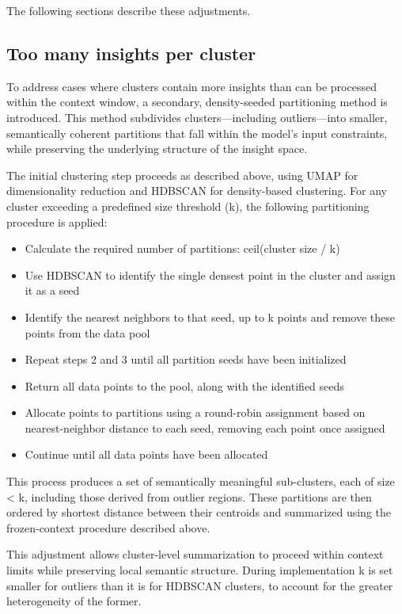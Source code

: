\documentclass[
  11pt,
]{article}
\providecommand{\tightlist}{%
  \setlength{\itemsep}{0pt}\setlength{\parskip}{0pt}}
\begin{document}
The following sections describe these adjustments.

\subsection{Too many insights per
cluster}\label{too-many-insights-per-cluster}

To address cases where clusters contain more insights than can be
processed within the context window, a secondary, density-seeded
partitioning method is introduced. This method subdivides
clusters---including outliers---into smaller, semantically coherent
partitions that fall within the model's input constraints, while
preserving the underlying structure of the insight space.

The initial clustering step proceeds as described above, using UMAP for
dimensionality reduction and HDBSCAN for density-based clustering. For
any cluster exceeding a predefined size threshold (k), the following
partitioning procedure is applied:

\begin{itemize}
\tightlist
\item
  Calculate the required number of partitions: ceil(cluster size / k)
\item
  Use HDBSCAN to identify the single densest point in the cluster and
  assign it as a seed
\item
  Identify the nearest neighbors to that seed, up to k points and remove
  these points from the data pool
\item
  Repeat steps 2 and 3 until all partition seeds have been initialized
\item
  Return all data points to the pool, along with the identified seeds
\item
  Allocate points to partitions using a round-robin assignment based on
  nearest-neighbor distance to each seed, removing each point once
  assigned
\item
  Continue until all data points have been allocated
\end{itemize}

This process produces a set of semantically meaningful sub-clusters,
each of size \textless{} k, including those derived from outlier
regions. These partitions are then ordered by shortest distance between
their centroids and summarized using the frozen-context procedure
described above.

This adjustment allows cluster-level summarization to proceed within
context limits while preserving local semantic structure. During
implementation k is set smaller for outliers than it is for HDBSCAN
clusters, to account for the greater heterogeneity of the former.
\end{document}
